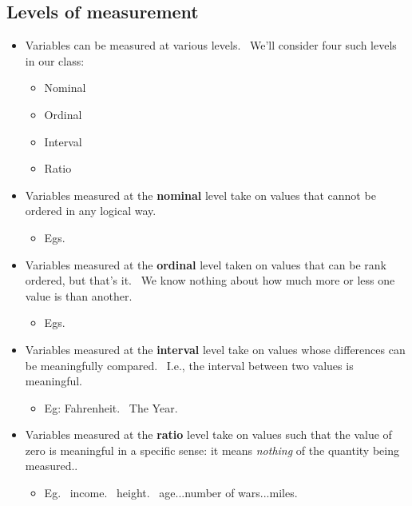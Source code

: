 \documentclass[11pt]{article}
\begin{document}
\subsection{Levels of measurement}

\begin{itemize}
\item Variables can be measured at various levels. \ We'll consider four
such levels in our class:

\begin{itemize}
\item Nominal

\item Ordinal

\item Interval

\item Ratio
\end{itemize}

\item Variables measured at the \textbf{nominal }level take on values that
cannot be ordered in any logical way.

\begin{itemize}
\item Egs.
\end{itemize}

\item Variables measured at the \textbf{ordinal} level taken on values that
can be rank ordered, but that's it. \ We know nothing about how much more or
less one value is than another.

\begin{itemize}
\item Egs.
\end{itemize}

\item Variables measured at the \textbf{interval} level take on values whose
differences can be meaningfully compared. \ I.e., the interval between two
values is meaningful.

\begin{itemize}
\item Eg: Fahrenheit. \ The Year.
\end{itemize}

\item Variables measured at the \textbf{ratio} level take on values such
that the value of zero is meaningful in a specific sense: it means \textit{%
nothing} of the quantity being measured.. \ 

\begin{itemize}
\item Eg. \ income. \ height. \ age...number of wars...miles. \ 
\end{itemize}


\end{itemize}
\end{document}
